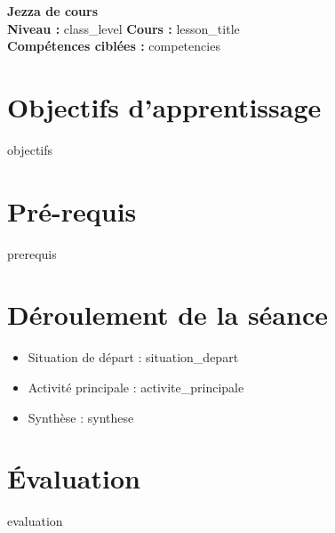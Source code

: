\documentclass[12pt]{article}
\begin{document}
\begin{center}
    {\LARGE \textbf{Jezza de cours}} \\[1ex]
    \textbf{Niveau :} {{ class_level }} \quad
    \textbf{Cours :} {{ lesson_title }} \\[1ex]
    \textbf{Compétences ciblées :} {{ competencies }}
\end{center}

\vspace{1em}

\section*{Objectifs d'apprentissage}
{{ objectifs }}

\section*{Pré-requis}
{{ prerequis }}

\section*{Déroulement de la séance}
\begin{itemize}[label=\textbullet]
    \item Situation de départ : {{ situation_depart }}
    \item Activité principale : {{ activite_principale }}
    \item Synthèse : {{ synthese }}
\end{itemize}

\section*{Évaluation}
{{ evaluation }}
\end{document}

